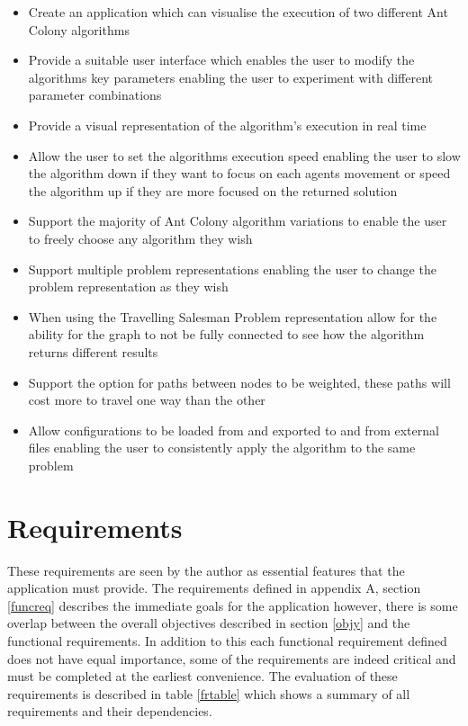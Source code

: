 \begin{itemize}
\item Create an application which can visualise the execution of two different Ant Colony algorithms
\item Provide a suitable user interface which enables the user to modify the algorithms key parameters enabling the user to experiment with different parameter combinations
\item Provide a visual representation of the algorithm’s execution in real time
\item Allow the user to set the algorithms execution speed enabling the user to slow the algorithm down if they want to focus on each agents movement or speed the algorithm up if they are more focused on the returned solution
\item Support the majority of Ant Colony algorithm variations to enable the user to freely choose any algorithm they wish
\item Support multiple problem representations enabling the user to change the problem representation as they wish
\item When using the Travelling Salesman Problem representation allow for the ability for the graph to not be fully connected to see how the algorithm returns different results
\item Support the option for paths between nodes to be weighted, these paths will cost more to travel one way than the other
\item Allow configurations to be loaded from and exported to and from external files enabling the user to consistently apply the algorithm to the same problem
\end{itemize}


\section{Requirements}
\label{funcymcdunky}
These requirements are seen by the author as essential features that the application must provide. The requirements defined in appendix A, section \ref{funcreq} describes the immediate goals for the application however, there is some overlap between the overall objectives described in section \ref{objy} and the functional requirements. In addition to this each functional requirement defined does not have equal importance, some of the requirements are indeed critical and must be completed at the earliest convenience. The evaluation of these requirements is described in table \ref{frtable} which shows a summary of all requirements and their dependencies.

